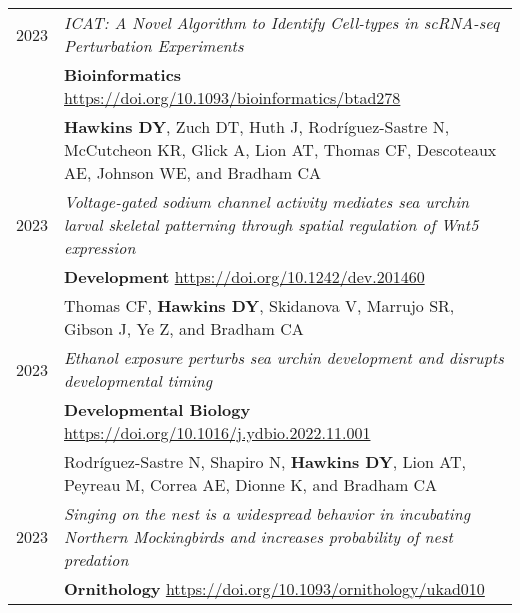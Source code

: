 \documentclass[a4paper,10pt]{report}
\begin{document}
\section{\color{linkcolour}{Publications}}
\begin{tabular}{rp{10cm}}
	\textsc{2023} & \emph{ICAT: A Novel Algorithm to Identify Cell-types in scRNA-seq Perturbation Experiments}                                                                   \\
	              & \small \textbf{Bioinformatics} \href{https://doi.org/10.1093/bioinformatics/btad278}{https://doi.org/10.1093/bioinformatics/btad278}                          \\
	              & \footnotesize \textbf{Hawkins DY}, Zuch DT, Huth J, Rodríguez-Sastre N, McCutcheon KR, Glick A, Lion AT, Thomas CF, Descoteaux AE, Johnson WE, and Bradham CA \\
	\textsc{2023} & \emph{Voltage-gated sodium channel activity mediates sea urchin larval skeletal patterning through spatial regulation of Wnt5 expression}                     \\
	              & \small \textbf{Development} \href{https://doi.org/10.1242/dev.201460}{https://doi.org/10.1242/dev.201460}                                                     \\
	              & \footnotesize Thomas CF, \textbf{Hawkins DY}, Skidanova V, Marrujo SR, Gibson J, Ye Z, and Bradham CA                                                         \\
	\textsc{2023} & \emph{Ethanol exposure perturbs sea urchin development and disrupts developmental timing}                                                                     \\
	              & \small \textbf{Developmental Biology} \href{https://doi.org/10.1016/j.ydbio.2022.11.001}{https://doi.org/10.1016/j.ydbio.2022.11.001}                         \\
	              & \footnotesize Rodríguez-Sastre N, Shapiro N, \textbf{Hawkins DY}, Lion AT, Peyreau M, Correa AE, Dionne K, and Bradham CA                                     \\
	\textsc{2023} & \emph{Singing on the nest is a widespread behavior in incubating Northern Mockingbirds and increases probability of nest predation}                           \\
	              & \small \textbf{Ornithology}  \href{https://doi.org/10.1093/ornithology/ukad010}{https://doi.org/10.1093/ornithology/ukad010}                                  \\

\end{tabular}
\end{document}
